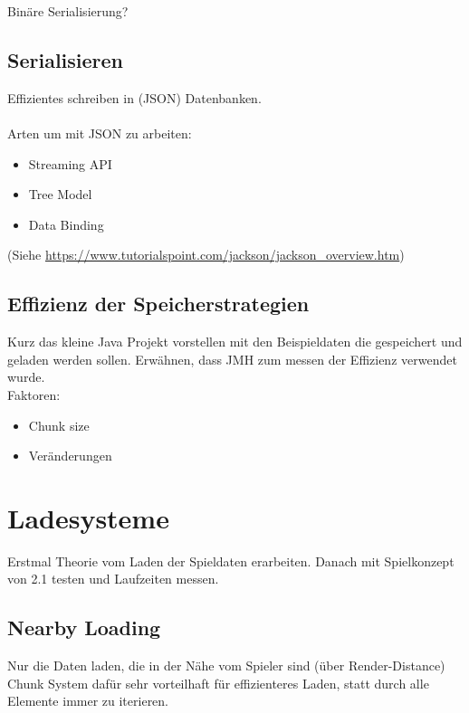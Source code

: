 Binäre Serialisierung?

\subsection{Serialisieren}
Effizientes schreiben in (JSON) Datenbanken.\\\\
Arten um mit JSON zu arbeiten:
\begin{itemize}
    \item Streaming API
    \item Tree Model
    \item Data Binding
\end{itemize}
(Siehe \url{https://www.tutorialspoint.com/jackson/jackson_overview.htm})


\subsection{Effizienz der Speicherstrategien}
Kurz das kleine Java Projekt vorstellen mit den Beispieldaten die gespeichert und geladen
werden sollen. Erwähnen, dass JMH zum messen der Effizienz verwendet wurde.\\

Faktoren:\\
\begin{itemize}
    \item Chunk size
    \item Veränderungen
\end{itemize}

\section{Ladesysteme}
Erstmal Theorie vom Laden der Spieldaten erarbeiten. Danach mit Spielkonzept
von 2.1 testen und Laufzeiten messen.


\subsection{Nearby Loading}
Nur die Daten laden, die in der Nähe vom Spieler sind (über Render-Distance)\\
Chunk System dafür sehr vorteilhaft für effizienteres Laden, statt durch alle Elemente
immer zu iterieren.


